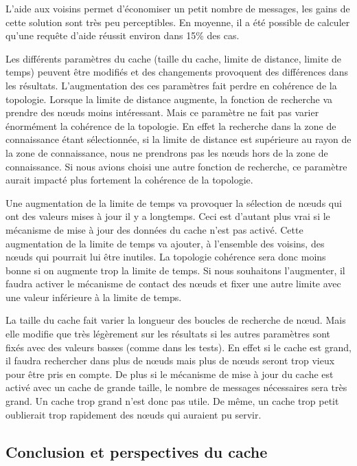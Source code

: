 \par L'aide aux voisins permet d'économiser un petit nombre de messages, les gains de cette solution sont très peu perceptibles. En moyenne, il a été possible de calculer qu'une requête d'aide réussit environ dans 15\% des cas.

\par Les différents paramètres du cache (taille du cache, limite de distance, limite de temps) peuvent être modifiés et des changements provoquent des différences dans les résultats. L'augmentation des ces paramètres fait perdre en cohérence de la topologie. Lorsque la limite de distance augmente, la fonction de recherche va prendre des nœuds moins intéressant. Mais ce paramètre ne fait pas varier énormément la cohérence de la topologie. En effet la recherche dans la zone de connaissance étant sélectionnée, si la limite de distance est supérieure au rayon de la zone de connaissance, nous ne prendrons pas les nœuds hors de la zone de connaissance. Si nous avions choisi une autre fonction de recherche, ce paramètre aurait impacté plus fortement la cohérence de la topologie.
\par Une augmentation de la limite de temps va provoquer la sélection de nœuds qui ont des valeurs mises à jour il y a longtemps. Ceci est d'autant plus vrai si le mécanisme de mise à jour des données du cache n'est pas activé. Cette augmentation de la limite de temps va ajouter, à l'ensemble des voisins, des nœuds qui pourrait lui être inutiles. La topologie cohérence sera donc moins bonne si on augmente trop la limite de temps. Si nous souhaitons l'augmenter, il faudra activer le mécanisme de contact des nœuds et fixer une autre limite avec une valeur inférieure à la limite de temps.
\par La taille du cache fait varier la longueur des boucles de recherche de nœud. Mais elle modifie que très légèrement sur les résultats si les autres paramètres sont fixés avec des valeurs basses (comme dans les tests). En effet si le cache est grand, il faudra rechercher dans plus de nœuds mais plus de nœuds seront trop vieux pour être pris en compte. De plus si le mécanisme de mise à jour du cache est activé avec un cache de grande taille, le nombre de messages nécessaires sera très grand. Un cache trop grand n'est donc pas utile. De même, un cache trop petit oublierait trop rapidement des nœuds qui auraient pu servir.  

\subsection{Conclusion et perspectives du cache} 


